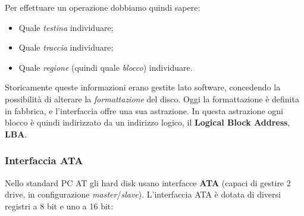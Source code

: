 \documentclass[a4paper,11pt]{article}
\begin{document}
Per effettuare un operazione dobbiamo quindi sapere:
\begin{itemize}
	\item Quale \textit{testina} individuare;
	\item Quale \textit{traccia} individuare;
	\item Quale \textit{regione} (quindi quale \textit{blocco}) individuare.
\end{itemize}
Storicamente queste informazioni erano gestite lato software, concedendo la possibilità di alterare la \textit{formattazione} del disco.
Oggi la formattazione è definita in fabbrica, e l'interfaccia offre una sua astrazione.
In questa astrazione ogni blocco è quindi indirizzato da un indirizzo logico, il \textbf{Logical Block Address}, \textbf{LBA}.

\subsubsection{Interfaccia ATA}
Nello standard PC AT gli hard disk usano interfacce \textbf{ATA} (capaci di gestire 2 drive, in configurazione \textit{master}/\textit{slave}).
L'interfaccia ATA è dotata di diversi registri a 8 bit e uno a 16 bit:
\end{document}
